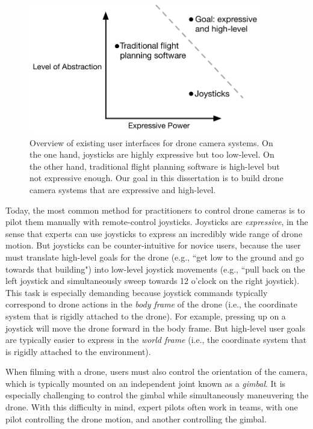 \begin{figure}[th!]
\centering
\includegraphics[width=4.0in]{images/2018_introduction/intro.pdf}
\caption{
Overview of existing user interfaces for drone camera systems.
On the one hand, joysticks are highly expressive but too low-level.
On the other hand, traditional flight planning software is high-level but not expressive enough.
Our goal in this dissertation is to build drone camera systems that are expressive and high-level.
}
\label{fig:ch1:intro}
\end{figure}

Today, the most common method for practitioners to control drone cameras is to pilot them manually with remote-control joysticks.
Joysticks are \emph{expressive}, in the sense that experts can use joysticks to express an incredibly wide range of drone motion.
But joysticks can be counter-intuitive for novice users, because the user must translate high-level goals for the drone (e.g., ``get low to the ground and go towards that building") into low-level joystick movements (e.g., ``pull back on the left joystick and simultaneously sweep towards 12 o'clock on the right joystick).
This task is especially demanding because joystick commands typically correspond to drone actions in the \emph{body frame} of the drone (i.e., the coordinate system that is rigidly attached to the drone). 
For example, pressing up on a joystick will move the drone forward in the body frame.
But high-level user goals are typically easier to express in the \emph{world frame} (i.e., the coordinate system that is rigidly attached to the environment).

When filming with a drone, users must also control the orientation of the camera, which is typically mounted on an independent joint known as a \emph{gimbal}.
It is especially challenging to control the gimbal while simultaneously maneuvering the drone.
With this difficulty in mind, expert pilots often work in teams, with one pilot controlling the drone motion, and another controlling the gimbal.

